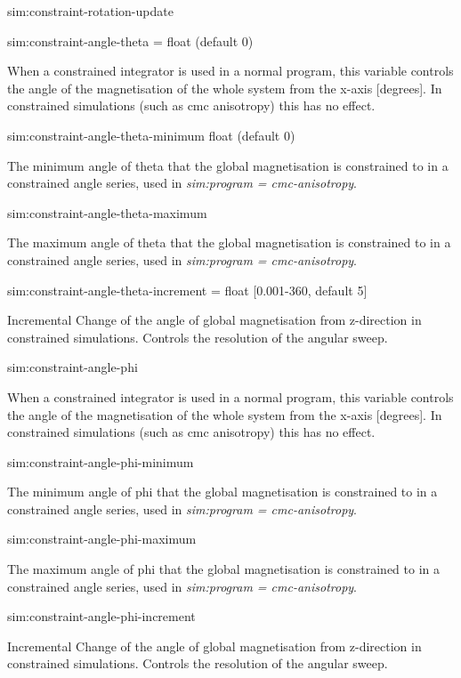 {\zicf sim:constraint-rotation-update}

{\zicf sim:constraint-angle-theta = float (default 0)} When a constrained integrator is used in a normal program, this variable controls the angle of the magnetisation of the whole system from the x-axis [degrees]. In constrained simulations (such as cmc anisotropy) this has no effect.

{\zicf  sim:constraint-angle-theta-minimum float (default 0)}   The minimum angle of theta that the global magnetisation is constrained to in a constrained angle series, used in \textit{sim:program = cmc-anisotropy}.

{\zicf  sim:constraint-angle-theta-maximum} The maximum angle of theta that the global magnetisation is constrained to in a constrained angle series, used in \textit{sim:program = cmc-anisotropy}.

{\zicf  sim:constraint-angle-theta-increment = float [0.001-360, default 5]} Incremental Change of the angle of global magnetisation from z-direction in constrained simulations. Controls the resolution of the angular sweep.

{\zicf sim:constraint-angle-phi} When a constrained integrator is used in a normal program, this variable controls the angle of the magnetisation of the whole system from the x-axis [degrees]. In constrained simulations (such as cmc anisotropy) this has no effect.

{\zicf sim:constraint-angle-phi-minimum} The minimum angle of phi that the global magnetisation is constrained to in a constrained angle series, used in \textit{sim:program = cmc-anisotropy}.

{\zicf sim:constraint-angle-phi-maximum} The maximum angle of phi that the global magnetisation is constrained to in a constrained angle series, used in \textit{sim:program = cmc-anisotropy}.

{\zicf sim:constraint-angle-phi-increment} Incremental Change of the angle of global magnetisation from z-direction in constrained simulations. Controls the resolution of the angular sweep.

